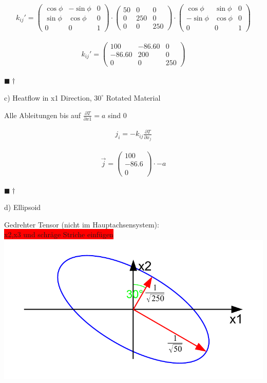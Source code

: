 \documentclass[a4paper]{scrartcl}
\newcommand{\qed}{\begin{flushright}
$\blacksquare \dagger$ \end{flushright}}
\begin{document}
\begin{align}
k_{ij}'=\begin{pmatrix}
\cos{\phi} & -\sin{\phi} & 0 \\
\sin{\phi} & \cos{\phi} & 0 \\
0 & 0 & 1
\end{pmatrix}
\cdot
\begin{pmatrix}
50 & 0 & 0 \\
0 & 250 & 0 \\
0 & 0 & 250 
\end{pmatrix}
\cdot
\begin{pmatrix}
\cos{\phi} & \sin{\phi} & 0 \\
-\sin{\phi} & \cos{\phi} & 0 \\
0 & 0 & 1
\end{pmatrix}
\end{align}

\begin{align}
k_{ij}'=\begin{pmatrix}
100 & -86.60 & 0 \\
-86.60 & 200 & 0 \\
0 & 0 & 250
\end{pmatrix}
\end{align}
\qed

c) Heatflow in x1 Direction, $30^\circ$ Rotated Material

Alle Ableitungen bis auf $\frac{\partial T}{\partial x1}=a$ sind 0


\begin{align}
j_i=-k_{ij} \frac{\partial T}{\partial x_j}
\end{align}

\begin{align}
\vec{j}=\begin{pmatrix}
100 \\
-86.6 \\
0
\end{pmatrix}
\cdot -a
\end{align}

\qed
d) Ellipsoid

\begin{center}
Gedrehter Tensor (nicht im Hauptachsensystem):\\
\colorbox{red}{x2,x3 und schräge Striche einfügen}
\includegraphics[scale=0.8]{images/quadrik_2d_ellipse_uebung_rotation.pdf}
\end{center}
\end{document}
